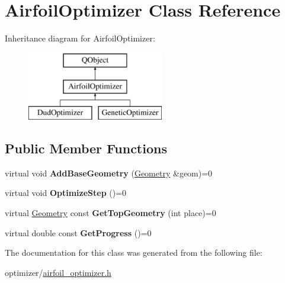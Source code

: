 \hypertarget{class_airfoil_optimizer}{}\section{Airfoil\+Optimizer Class Reference}
\label{class_airfoil_optimizer}
Inheritance diagram for Airfoil\+Optimizer\+:\begin{figure}[H]
\begin{center}
\leavevmode
\includegraphics[height=3.000000cm]{class_airfoil_optimizer}
\end{center}
\end{figure}
\subsection*{Public Member Functions}
\begin{DoxyCompactItemize}
\item 
\hypertarget{class_airfoil_optimizer_a8bff6847d64da457709efdb4e745faca}{}\label{class_airfoil_optimizer_a8bff6847d64da457709efdb4e745faca} 
virtual void {\bfseries Add\+Base\+Geometry} (\hyperlink{class_geometry}{Geometry} \&geom)=0
\item 
\hypertarget{class_airfoil_optimizer_aae4cfe4a39abc62969ff452ffb39a7cc}{}\label{class_airfoil_optimizer_aae4cfe4a39abc62969ff452ffb39a7cc} 
virtual void {\bfseries Optimize\+Step} ()=0
\item 
\hypertarget{class_airfoil_optimizer_afee9d3b8b967ae69f04a5daa392ee39e}{}\label{class_airfoil_optimizer_afee9d3b8b967ae69f04a5daa392ee39e} 
virtual \hyperlink{class_geometry}{Geometry} const {\bfseries Get\+Top\+Geometry} (int place)=0
\item 
\hypertarget{class_airfoil_optimizer_a9c6bfbbf160a67847a9283cee0676a72}{}\label{class_airfoil_optimizer_a9c6bfbbf160a67847a9283cee0676a72} 
virtual double const {\bfseries Get\+Progress} ()=0
\end{DoxyCompactItemize}


The documentation for this class was generated from the following file\+:\begin{DoxyCompactItemize}
\item 
optimizer/\hyperlink{airfoil__optimizer_8h}{airfoil\+\_\+optimizer.\+h}\end{DoxyCompactItemize}
